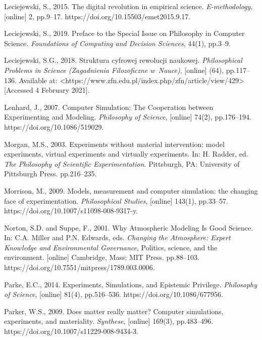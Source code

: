 Leciejewski, S., 2015. The digital revolution in empirical science. \textit{E-methodology}, [online] 2, pp.9–17. https://doi.org/10.15503/emet2015.9.17.



Leciejewski, S., 2019. Preface to the Special Issue on Philosophy in Computer Science. \textit{Foundations of Computing and Decision Sciences}, 44(1), pp.3–9.



Leciejewski, S.G., 2018. Struktura cyfrowej rewolucji naukowej. \textit{Philosophical Problems in Science (Zagadnienia Filozoficzne w~Nauce)}, [online] (64), pp.117–136. Available at: {\textless}https://www.zfn.edu.pl/index.php/zfn/article/view/429{\textgreater} [Accessed 4 February 2021].



Lenhard, J., 2007. Computer Simulation: The Cooperation between Experimenting and Modeling. \textit{Philosophy of Science}, [online] 74(2), pp.176–194. https://doi.org/10.1086/519029.



Morgan, M.S., 2003. Experiments without material intervention: model experiments, virtual experiments and virtually experiments. In: H. Radder, ed. \textit{The Philosophy of Scientific Experimentation}. Pittsburgh, PA: University of Pittsburgh Press. pp.216–235.



Morrison, M., 2009. Models, measurement and computer simulation: the changing face of experimentation. \textit{Philosophical Studies}, [online] 143(1), pp.33–57. https://doi.org/10.1007/s11098-008-9317-y.



Norton, S.D. and Suppe, F., 2001. Why Atmospheric Modeling Is Good Science. In: C.A. Miller and P.N. Edwards, eds. \textit{Changing the Atmosphere: Expert Knowledge and Environmental Governance}, Politics, science, and the environment. [online] Cambridge, Mass: MIT Press. pp.88–103. https://doi.org/10.7551/mitpress/1789.003.0006.



Parke, E.C., 2014. Experiments, Simulations, and Epistemic Privilege. \textit{Philosophy of Science}, [online] 81(4), pp.516–536. https://doi.org/10.1086/677956.



Parker, W.S., 2009. Does matter really matter? Computer simulations, experiments, and materiality. \textit{Synthese}, [online] 169(3), pp.483–496. https://doi.org/10.1007/s11229-008-9434-3.



